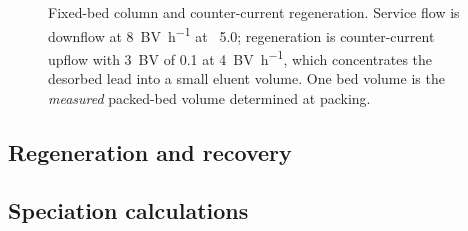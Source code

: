 \begin{figure}[htbp]
  \centering
  \caption[Fixed-bed column and counter-current regeneration]{Fixed-bed column and counter-current regeneration. Service flow is downflow at \SI{8}{BV\per\hour} at \pH~5.0; regeneration is counter-current upflow with \SI{3}{BV} of \SI{0.1}{\molar}  at \SI{4}{BV\per\hour}, which concentrates the desorbed lead into a small eluent volume. One bed volume is the \emph{measured} packed-bed volume determined at packing.}
  \label{fig:column-schematic}
\end{figure}

\subsection{Regeneration and recovery}
\label{sec:regeneration-method}
%

\subsection{Speciation calculations}
\label{sec:speciation-method}
